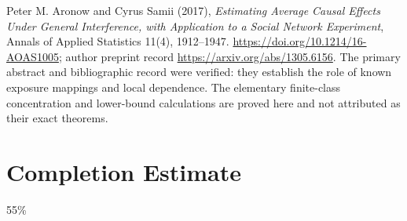 \documentclass[11pt,a4paper]{article}
\begin{document}
Peter M. Aronow and Cyrus Samii (2017), \emph{Estimating Average Causal Effects Under General Interference, with Application to a Social Network Experiment}, Annals of Applied Statistics 11(4), 1912--1947. \url{https://doi.org/10.1214/16-AOAS1005}; author preprint record \url{https://arxiv.org/abs/1305.6156}. The primary abstract and bibliographic record were verified: they establish the role of known exposure mappings and local dependence. The elementary finite-class concentration and lower-bound calculations are proved here and not attributed as their exact theorems.

\section{Completion Estimate}
55\%
\end{document}
